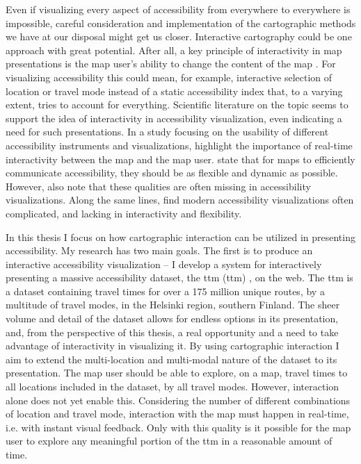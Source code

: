 Even if visualizing every aspect of accessibility
from everywhere to everywhere is impossible,
careful consideration and implementation
of the cartographic methods we have at our disposal might get us closer.
Interactive cartography could be one approach with great potential.
After all, a key principle of interactivity in map presentations is
the map user's ability to change the content of the map \parencite{rot2013b}.
For visualizing accessibility this could mean, for example,
interactive selection of location or travel mode instead of
a static accessibility index that, to a varying extent,
tries to account for everything.
Scientific literature on the topic seems to support the idea of
interactivity in accessibility visualization,
even indicating a need for such presentations.
In a study focusing on the usability of
different accessibility instruments and visualizations,  %
\textcite{te2014} highlight the importance of
real-time interactivity between the map and the map user.
\textcite{but2018} state that for maps to efficiently communicate accessibility,
they should be as flexible and dynamic as possible.
However, \textcite{but2018} also note that
these qualities are often missing in accessibility visualizations.
Along the same lines,
\textcite{paj2021} find modern accessibility visualizations often complicated,
and lacking in interactivity and flexibility.


In this thesis I focus on
how cartographic interaction can be utilized in presenting accessibility.
My research has two main goals.
The first is to produce an interactive accessibility visualization --
I develop a system for interactively presenting a massive accessibility dataset,
the \acrlong{ttm} (\acrshort{ttm}) \parencite{fin2023},
on the web.  %
The \acrshort{ttm} is a dataset containing travel times for
over a 175 million unique routes, by a multitude of travel modes,
in the Helsinki region, southern Finland.
The sheer volume and detail of the dataset allows for endless options
in its presentation, and, from the perspective of this thesis,
a real opportunity and a need to take advantage of interactivity in visualizing it.
By using cartographic interaction
I aim to extend the multi-location and multi-modal nature of the dataset
to its presentation.
The map user should be able to explore, on a map,
travel times to all locations included in the dataset,
by all travel modes.
However, interaction alone does not yet enable this.
Considering the number of different combinations of location and travel mode,
interaction with the map must happen in real-time,
i.e. with instant visual feedback.
Only with this quality is it possible for the map user to
explore any meaningful portion of the \acrshort{ttm}
in a reasonable amount of time.

